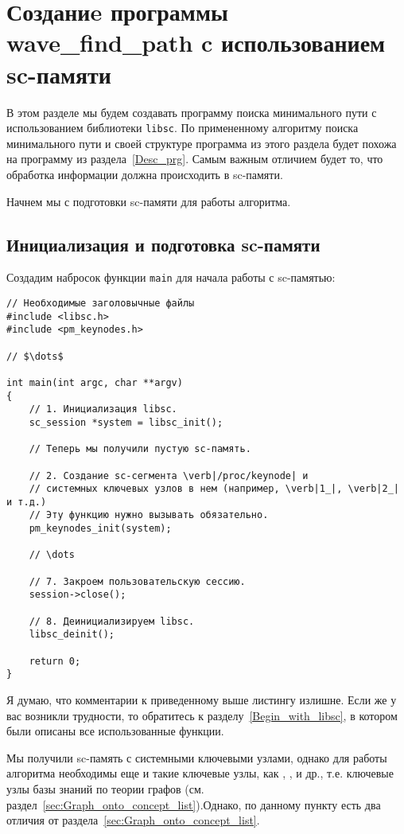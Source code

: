 \section{Созданиe программы wave\_find\_path c использованием sc-памяти}
\label{Desc_libscprg}

В этом разделе мы будем создавать программу поиска минимального пути с
использованием библиотеки \verb|libsc|. По примененному алгоритму
поиска минимального пути и своей структуре программа из этого раздела
будет похожа на программу из раздела~\ref{Desc_prg}. Самым важным
отличием будет то, что обработка информации должна происходить в
sc-памяти.

Начнем мы с подготовки sc-памяти для работы алгоритма.

\subsection{Инициализация и подготовка sc-памяти}
\label{libscprg_init_sc_memory}

Создадим набросок функции \lstinline|main| для начала работы с
sc-памятью:
\begin{lstlisting}[texcl]
// Необходимые заголовычные файлы
#include <libsc.h>
#include <pm_keynodes.h>

// $\dots$

int main(int argc, char **argv)
{
    // 1. Инициализация libsc.
    sc_session *system = libsc_init();

    // Теперь мы получили пустую sc-память.

    // 2. Создание sc-сегмента \verb|/proc/keynode| и
    // системных ключевых узлов в нем (например, \verb|1_|, \verb|2_| и т.д.)
    // Эту функцию нужно вызывать обязательно.
    pm_keynodes_init(system);

    // \dots

    // 7. Закроем пользовательскую сессию.
    session->close();

    // 8. Деинициализируем libsc.
    libsc_deinit();

    return 0;
}
\end{lstlisting}

Я думаю, что комментарии к приведенному выше листингу излишне. Если же
у вас возникли трудности, то обратитесь к
разделу~\ref{Begin_with_libsc}, в котором были описаны все
использованные функции.

Мы получили sc-память с системными ключевыми узлами, однако для работы
алгоритма необходимы еще и такие ключевые узлы, как
, ,  и др.,
т.е. ключевые узлы базы знаний по теории графов
(см. раздел~\ref{sec:Graph_onto_concept_list}).Однако, по данному
пункту есть два отличия от раздела~\ref{sec:Graph_onto_concept_list}.


